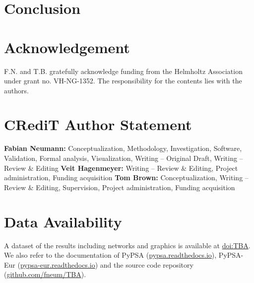 \documentclass[1p,11pt]{elsarticle}
\begin{document}


\section{Conclusion}
\label{sec:conclusion}



\section*{Acknowledgement}

F.N. and T.B. gratefully acknowledge funding from the Helmholtz
Association under grant no. VH-NG-1352.
The responsibility for the contents lies with the authors.
\doclicenseLongText
\doclicenseIcon

\section*{CRediT Author Statement}

\textbf{Fabian Neumann:} Conceptualization, Methodology, Investigation, Software, Validation, Formal analysis, Visualization, Writing -- Original Draft, Writing -- Review \& Editing
\textbf{Veit Hagenmeyer:} Writing -- Review \& Editing, Project administration, Funding acquisition
\textbf{Tom Brown:} Conceptualization, Writing -- Review \& Editing, Supervision, Project administration, Funding acquisition

\section*{Data Availability}

A dataset of the results including networks and graphics is available at \href{TBA}{doi:TBA}. 
We also refer to the documentation of PyPSA (\href{https://pypsa.readthedocs.io}{pypsa.readthedocs.io}),
PyPSA-Eur (\href{https://pypsa-eur.readthedocs.io}{pypsa-eur.readthedocs.io}) and the source code 
repository
(\href{https://github.com/fneum/TBA}{github.com/fneum/TBA}).



% 	
\end{document}
